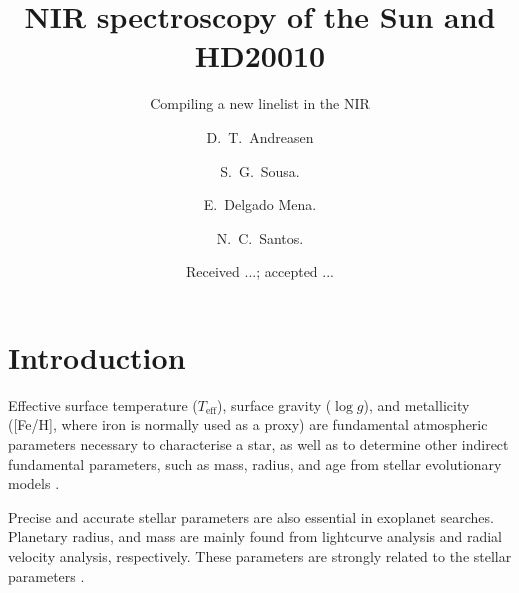 \documentclass{aa}
\begin{document}
\title{NIR spectroscopy of the Sun and HD20010}
\subtitle{Compiling a new linelist in the NIR}

\subtitle{}

\author{D.~T.~Andreasen
    \and S.~G.~Sousa.
    \and E.~Delgado Mena.
    \and N.~C.~Santos.}









\date{Received ...; accepted ...}

\abstract{}{}{}{}



\maketitle



\section{Introduction}
\label{sec:introduction}

Effective surface temperature ($T_\mathrm{eff}$), surface gravity
($\log g$), and metallicity ([Fe/H], where iron is normally used
as a proxy) are fundamental atmospheric parameters necessary to
characterise a star, as well as to determine other indirect fundamental
parameters, such as mass, radius, and age from stellar evolutionary
models \citep{Girardi2000}.

Precise and accurate stellar parameters are also essential in
exoplanet searches. Planetary radius, and mass are mainly found from
lightcurve analysis and radial velocity analysis, respectively.
These parameters are strongly related to the stellar parameters
\citep{Ammler2009,Torres2008,Torres2012}.
\end{document}

